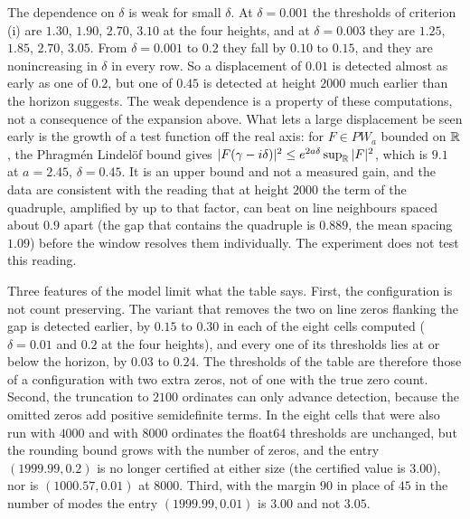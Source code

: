 The dependence on $\delta$ is weak for small $\delta$. At $\delta=0.001$ the thresholds of criterion (i) are $1.30$, $1.90$, $2.70$, $3.10$ at the four heights, and at $\delta=0.003$ they are $1.25$, $1.85$, $2.70$, $3.05$. From $\delta=0.001$ to $0.2$ they fall by $0.10$ to $0.15$, and they are nonincreasing in $\delta$ in every row. So a displacement of $0.01$ is detected almost as early as one of $0.2$, but one of $0.45$ is detected at height $2000$ much earlier than the horizon suggests. The weak dependence is a property of these computations, not a consequence of the expansion above. What lets a large displacement be seen early is the growth of a test function off the real axis: for $F\in PW_a$ bounded on $\mathbb{R}$, the Phragm\'en Lindel\"of bound gives $|F(\gamma-i\delta)|^2\le e^{2a\delta}\sup_{\mathbb{R}}|F|^2$, which is $9.1$ at $a=2.45$, $\delta=0.45$. It is an upper bound and not a measured gain, and the data are consistent with the reading that at height $2000$ the term of the quadruple, amplified by up to that factor, can beat on line neighbours spaced about $0.9$ apart (the gap that contains the quadruple is $0.889$, the mean spacing $1.09$) before the window resolves them individually. The experiment does not test this reading.

Three features of the model limit what the table says. First, the configuration is not count preserving. The variant that removes the two on line zeros flanking the gap is detected earlier, by $0.15$ to $0.30$ in each of the eight cells computed ($\delta=0.01$ and $0.2$ at the four heights), and every one of its thresholds lies at or below the horizon, by $0.03$ to $0.24$. The thresholds of the table are therefore those of a configuration with two extra zeros, not of one with the true zero count. Second, the truncation to $2100$ ordinates can only advance detection, because the omitted zeros add positive semidefinite terms. In the eight cells that were also run with $4000$ and with $8000$ ordinates the float64 thresholds are unchanged, but the rounding bound grows with the number of zeros, and the entry $(1999.99,0.2)$ is no longer certified at either size (the certified value is $3.00$), nor is $(1000.57,0.01)$ at $8000$. Third, with the margin $90$ in place of $45$ in the number of modes the entry $(1999.99,0.01)$ is $3.00$ and not $3.05$.

